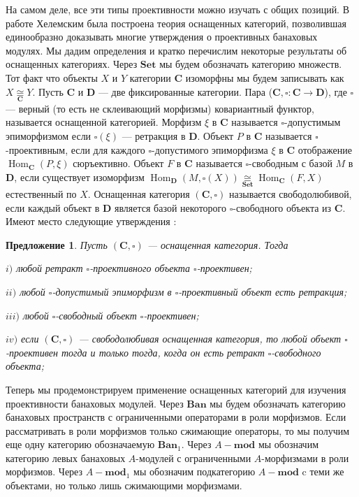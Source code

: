 \documentclass[12pt]{article}
\numberwithin{equation}{subsection}
\theoremstyle{plain}
\newtheorem{proposition}{Предложение}
\newcommand{\isom}[1]{\mathop{\mathbin{\cong}}\limits_{#1}}
\begin{document}
\begin{fulltext}
На самом деле, все эти типы проективности можно изучать с общих позиций. В работе \cite{HelMetrFrQMod} Хелемским была построена теория оснащенных категорий, позволившая единообразно доказывать многие утверждения о проективных банаховых модулях. Мы дадим определения и кратко перечислим некоторые результаты об оснащенных категориях. Через $\mathbf{Set}$ мы будем обозначать категорию множеств. Тот факт что объекты $X$ и $Y$ категории $\mathbf{C}$ изоморфны мы будем записывать как $X\isom{\mathbf{C}}Y$. Пусть $\mathbf{C}$ и $\mathbf{D}$ --- две фиксированные категории. Пара ($\mathbf{C}, \square:\mathbf{C}\to\mathbf{D}$), где $\square$ --- верный (то есть не склеивающий морфизмы) ковариантный функтор, называется оснащенной категорией. Морфизм $\xi$ в $\mathbf{C}$ называется $\square$-допустимым эпиморфизмом если $\square (\xi)$ --- ретракция в $\mathbf{D}$. Объект $P$ в $\mathbf{C}$ называется $\square$-проективным, если для каждого $\square$-допустимого эпиморфизма $\xi$ в $\mathbf{C}$ отображение $\operatorname{Hom}_{\mathbf{C}}(P,\xi)$ сюръективно. Объект $F$ в $\mathbf{C}$ называется $\square$-свободным с базой $M$ в  $\mathbf{D}$, если существует изоморфизм $\operatorname{Hom}_{\mathbf{D}}(M,\square(X))\isom{\mathbf{Set}}\operatorname{Hom}_{\mathbf{C}}(F,X)$ естественный по $X$. Оснащенная категория $(\mathbf{C},\square)$ называется свободолюбивой, если каждый объект в $\mathbf{D}$ является базой некоторого $\square$-свободного объекта из $\mathbf{C}$. Имеют место следующие утверждения \cite{HelMetrFrQMod}:

\begin{proposition}\label{RiggCatResults} Пусть $(\mathbf{C},\square)$ --- оснащенная категория. Тогда

$i)$ любой ретракт $\square$-проективного объекта $\square$-проективен;

$ii)$ любой $\square$-допустимый эпиморфизм в $\square$-проективный объект есть ретракция;

$iii)$ любой $\square$-свободный объект $\square$-проективен;

$iv)$ если $(\mathbf{C},\square)$ --- свободолюбивая оснащенная категория, то любой объект $\square$-\newline проективен тогда и только тогда, когда он есть ретракт $\square$-свободного объекта;
\end{proposition}

Теперь мы продемонстрируем применение оснащенных категорий для изучения проективности банаховых модулей.  Через $\mathbf{Ban}$ мы будем обозначать категорию банаховых пространств с ограниченными операторами в роли морфизмов. Если рассматривать в роли морфизмов только сжимающие операторы, то мы получим еще одну категорию обозначаемую $\mathbf{Ban}_1$. Через $A-\mathbf{mod}$ мы обозначим категорию левых банаховых $A$-модулей с ограниченными $A$-морфизмами в роли морфизмов. Через $A-\mathbf{mod}_1$ мы обозначим подкатегорию $A-\mathbf{mod}$ c теми же объектами, но только лишь сжимающими морфизмами. 


\end{fulltext}
\end{document}
